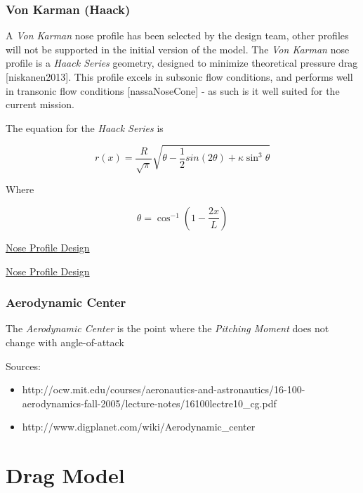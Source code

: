 \documentclass[]{article}
\providecommand{\tightlist}{%
  \setlength{\itemsep}{0pt}\setlength{\parskip}{0pt}}
\begin{document}
\subsubsection{Von Karman (Haack)}\label{von-karman-haack}

A \emph{Von Karman} nose profile has been selected by the design team,
other profiles will not be supported in the initial version of the
model. The \emph{Von Karman} nose profile is a \emph{Haack Series}
geometry, designed to minimize theoretical pressure drag
{[}niskanen2013{]}. This profile excels in subsonic flow conditions, and
performs well in transonic flow conditions {[}nassaNoseCone{]} - as such
is it well suited for the current mission.

The equation for the \emph{Haack Series} is

\begin{equation}
r(x) = \dfrac{R}{\sqrt{\pi}} \sqrt{ \theta - \dfrac{1}{2} sin (2 \theta) + \kappa \sin^3 \theta }
\end{equation}

Where

\begin{equation}
\theta = \cos^{-1} \left( 1 - \dfrac{2x}{L} \right)
\end{equation}

\href{http://rimworld.com/nassarocketry/fabrication/nosecones/design.html}{Nose
Profile Design}

\href{https://en.wikipedia.org/wiki/Nose_cone_design\#Von_K.C3.A1rm.C3.A1n}{Nose
Profile Design}

\subsubsection{Aerodynamic Center}\label{aerodynamic-center}

The \emph{Aerodynamic Center} is the point where the \emph{Pitching
Moment} does not change with angle-of-attack

Sources:

\begin{itemize}
\tightlist
\item
  http://ocw.mit.edu/courses/aeronautics-and-astronautics/16-100-aerodynamics-fall-2005/lecture-notes/16100lectre10\_cg.pdf
\item
  http://www.digplanet.com/wiki/Aerodynamic\_center
\end{itemize}

\section{Drag Model}\label{drag-model}
\end{document}
